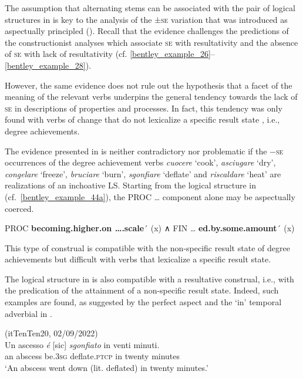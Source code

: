\documentclass[output=paper,colorlinks,citecolor=brown
]{langscibook}
\begin{document}
The assumption that alternating stems can be associated with the pair of logical structures in  is key to the analysis of the ±\textsc{se} variation that was introduced as aspectually principled (). Recall that the evidence challenges the predictions of the constructionist analyses which associate \textsc{se} with resultativity and the absence of \textsc{se} with lack of resultativity (cf. \ref{bentley_example_26}--\ref{bentley_example_28}). 

However, the same evidence does not rule out the hypothesis that a facet of the meaning of the relevant verbs underpins the general tendency towards the lack of \textsc{se} in descriptions of properties and processes. In fact, this tendency was only found with verbs of change that do not lexicalize a specific result state \citep{cennamo2012aspectual}, i.e., degree achievements. 

The evidence presented in  is neither contradictory nor problematic if the −\textsc{se} occurrences of the degree achievement verbs \textit{cuocere} ‘cook’, \textit{asciugare} ‘dry’, \textit{congelare} ‘freeze’, \textit{bruciare} ‘burn’, \textit{sgonfiare} ‘deflate’ and \textit{riscaldare} ‘heat’ are realizations of an inchoative LS. Starting from the logical structure in  (cf.~\ref{bentley_example_44a}), the PROC \ldots{} component alone may be aspectually coerced. 

\ea \label{bentley_example_48}
    PROC \textbf{becoming.higher.on \ldots.scale}´ (x) ∧ FIN  \ldots{} \textbf{ed.by.some.amount}´ (x)
\z

This type of construal is compatible with the non-specific result state of degree achievements but difficult with verbs that lexicalize a specific result state. 

The logical structure in  is also compatible with a resultative construal, i.e., with the predication of the attainment of a non-specific result state. Indeed, such examples are found, as suggested by the perfect aspect and the ‘in’ temporal adverbial in .

\ea \label{bentley_example_49}(itTenTen20, 02/09/2022)\\
    \gll Un ascesso	{\textit{é} [sic]} 		\textit{sgonfiato}				in venti 			minuti. \\
    an	abscess be.3\textsc{sg}		deflate.\textsc{ptcp}		in	twenty		minutes \\
    \glt ‘An abscess went down (lit. deflated) in twenty minutes.’
\z
\end{document}
